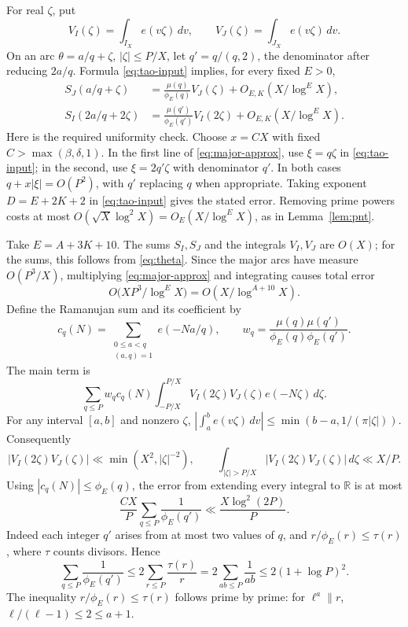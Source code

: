 \documentclass[11pt,letterpaper]{article}
\numberwithin{equation}{section}
\theoremstyle{remark}
\newcommand{\R}{\mathbb R}
\newcommand{\tot}{\phi_{\!E}}
\begin{document}
For real $\zeta$, put
\[
 V_I(\zeta)=\int_{I_X}e(v\zeta)\,dv,\qquad
 V_J(\zeta)=\int_{J_X}e(v\zeta)\,dv.
\]
On an arc $\theta=a/q+\zeta$, $|\zeta|\le P/X$, let
$q'=q/(q,2)$, the denominator after reducing $2a/q$.
Formula \eqref{eq:tao-input} implies, for every fixed $E>0$,
\begin{equation}\label{eq:major-approx}
 \begin{aligned}
 S_J(a/q+\zeta)
  &=\frac{\mu(q)}{\tot(q)}V_J(\zeta)+O_{E,K}(X/\log^E X),\\
 S_I(2a/q+2\zeta)
  &=\frac{\mu(q')}{\tot(q')}V_I(2\zeta)+O_{E,K}(X/\log^E X).
 \end{aligned}
\end{equation}
Here is the required uniformity check. Choose $x=CX$ with fixed
$C>\max(\beta,\delta,1)$. In the first line of \eqref{eq:major-approx},
use $\xi=q\zeta$ in \eqref{eq:tao-input}; in the second, use
$\xi=2q'\zeta$ with denominator $q'$. In both cases
$q+x|\xi|=O(P^2)$, with $q'$ replacing $q$ when appropriate.
Taking exponent $D=E+2K+2$ in \eqref{eq:tao-input} gives the
stated error. Removing prime powers costs at most
$O(\sqrt X\log^2X)=O_E(X/\log^E X)$, as in Lemma~\ref{lem:pnt}.

Take $E=A+3K+10$. The sums $S_I,S_J$ and the integrals $V_I,V_J$
are $O(X)$; for the sums, this follows from \eqref{eq:theta}.
Since the major arcs have measure $O(P^3/X)$, multiplying
\eqref{eq:major-approx} and integrating causes total error
\begin{equation}\label{eq:major-product-error}
 O\bigl(XP^3/\log^E X\bigr)=O(X/\log^{A+10}X).
\end{equation}
Define the Ramanujan sum and its coefficient by
\[
 c_q(N)=\sum_{\substack{0\le a<q\\(a,q)=1}}e(-Na/q),\qquad
 w_q=\frac{\mu(q)\mu(q')}{\tot(q)\tot(q')}.
\]
The main term is
\[
 \sum_{q\le P}w_qc_q(N)
 \int_{-P/X}^{P/X}V_I(2\zeta)V_J(\zeta)e(-N\zeta)\,d\zeta.
\]
For any interval $[a,b]$ and nonzero $\zeta$,
$|\int_a^b e(v\zeta)\,dv|\le\min(b-a,1/(\pi|\zeta|))$.
Consequently
\[
 |V_I(2\zeta)V_J(\zeta)|\ll\min(X^2,|\zeta|^{-2}),
 \qquad
 \int_{|\zeta|>P/X}|V_I(2\zeta)V_J(\zeta)|\,d\zeta\ll X/P.
\]
Using $|c_q(N)|\le\tot(q)$, the error from extending every integral
to $\R$ is at most
\begin{equation}\label{eq:integral-tail}
 \frac{CX}{P}\sum_{q\le P}\frac1{\tot(q')}
 \ll\frac{X\log^2(2P)}{P}.
\end{equation}
Indeed each integer $q'$ arises from at most two values of $q$,
and $r/\tot(r)\le\tau(r)$, where $\tau$ counts divisors. Hence
\[
 \sum_{q\le P}\frac1{\tot(q')}
 \le2\sum_{r\le P}\frac{\tau(r)}r
 =2\sum_{ab\le P}\frac1{ab}
 \le2(1+\log P)^2.
\]
The inequality $r/\tot(r)\le\tau(r)$ follows prime by prime:
for $\ell^a\parallel r$, $\ell/(\ell-1)\le2\le a+1$.
\end{document}
